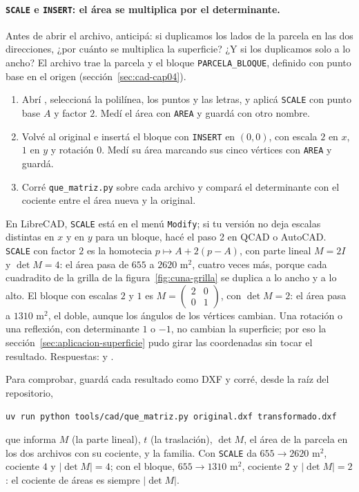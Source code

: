 \paragraph{\texttt{SCALE} e \texttt{INSERT}: el área se multiplica por el determinante.}
Antes de abrir el archivo, anticipá: si duplicamos los lados de la parcela en las dos
direcciones, ¿por cuánto se multiplica la superficie? ¿Y si los duplicamos solo a lo ancho? El
archivo trae la parcela y el bloque \texttt{PARCELA\_BLOQUE}, definido con punto base en el
origen (sección~\ref{sec:cad-cap04}).
\begin{enumerate}
  \item Abrí , seleccioná la polilínea, los puntos y las letras, y
  aplicá \texttt{SCALE} con punto base \(A\) y factor \(2\). Medí el área con \texttt{AREA} y
  guardá con otro nombre.
  \item Volvé al original e insertá el bloque con \texttt{INSERT} en \((0,0)\), con escala
  \(2\) en \(x\), \(1\) en \(y\) y rotación \(0\). Medí su área marcando sus cinco vértices
  con \texttt{AREA} y guardá.
  \item Corré \texttt{que\_matriz.py} sobre cada archivo y compará el determinante con el
  cociente entre el área nueva y la original.
\end{enumerate}
En LibreCAD, \texttt{SCALE} está en el menú \texttt{Modify}; si tu versión no deja escalas
distintas en \(x\) y en \(y\) para un bloque, hacé el paso 2 en QCAD o AutoCAD.
\texttt{SCALE} con factor \(2\) es la homotecia \(p\mapsto A+2(p-A)\), con parte lineal
\(M=2I\) y \(\det M=4\): el área pasa de \(655\) a \(2620\) m\(^2\), cuatro veces más, porque
cada cuadradito de la grilla de la figura~\ref{fig:cuna-grilla} se duplica a lo ancho y a lo
alto. El bloque con escalas \(2\) y \(1\) es
\(M=\left(\begin{smallmatrix}2&0\\0&1\end{smallmatrix}\right)\), con \(\det M=2\): el área
pasa a \(1310\) m\(^2\), el doble, aunque los ángulos de los vértices cambian. Una rotación o
una reflexión, con determinante \(1\) o \(-1\), no cambian la superficie; por eso la
sección~\ref{sec:aplicacion-superficie} pudo girar las coordenadas sin tocar el resultado.
Respuestas:  y
.

Para comprobar, guardá cada resultado como DXF y corré, desde la raíz del repositorio,
\begin{center}\small
\texttt{uv run python tools/cad/que\_matriz.py original.dxf transformado.dxf}
\end{center}
que informa \(M\) (la parte lineal), \(t\) (la traslación), \(\det M\), el área de la parcela en
los dos archivos con su cociente, y la familia. Con \texttt{SCALE} da
\(655\to2620\) m\(^2\), cociente \(4\) y \(\lvert\det M\rvert=4\); con el bloque,
\(655\to1310\) m\(^2\), cociente \(2\) y \(\lvert\det M\rvert=2\): el cociente de áreas es
siempre \(\lvert\det M\rvert\).

